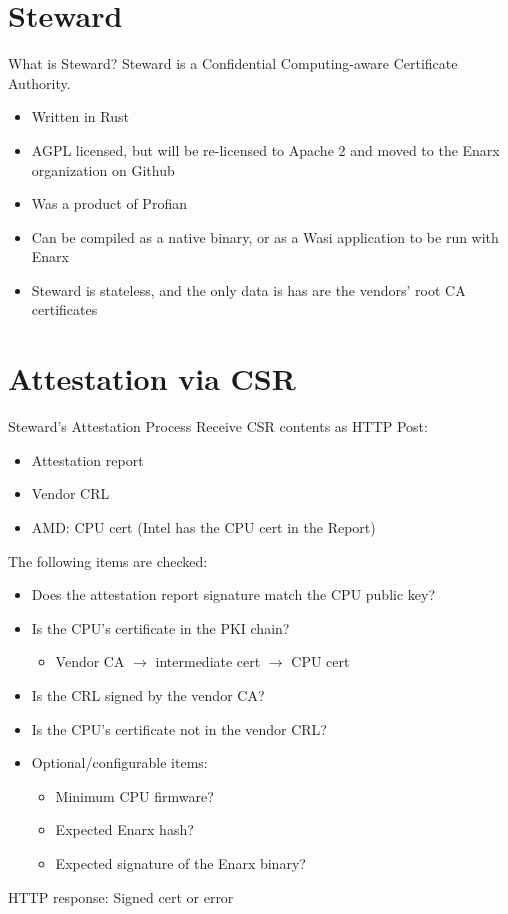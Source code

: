 \documentclass[graphics]{beamer}
\begin{document}
\section{Steward}
\begin{frame}{What is Steward?}
Steward is a Confidential Computing-aware Certificate Authority.
\begin{itemize}
\item Written in Rust
\item AGPL licensed, but will be re-licensed to Apache 2 and moved to the Enarx organization on Github
\item Was a product of Profian
\item Can be compiled as a native binary, or as a Wasi application to be run with Enarx
\item Steward is stateless, and the only data is has are the vendors' root CA certificates
\end{itemize}

\end{frame}

\section{Attestation via CSR}
\begin{frame}{Steward's Attestation Process}
Receive CSR contents as HTTP Post:
\begin{itemize}
    \item Attestation report
    \item Vendor CRL
    \item AMD: CPU cert (Intel has the CPU cert in the Report)
\end{itemize}

The following items are checked:
\begin{itemize}
    \item Does the attestation report signature match the CPU public key?
    \item Is the CPU's certificate in the PKI chain?
    \begin{itemize}
        \item Vendor CA $\rightarrow$ intermediate cert $\rightarrow$ CPU cert
    \end{itemize}
    \item Is the CRL signed by the vendor CA?
    \item Is the CPU's certificate not in the vendor CRL?
    \item Optional/configurable items:
    \begin{itemize}
        \item Minimum CPU firmware?
        \item Expected Enarx hash?
        \item Expected signature of the Enarx binary?
    \end{itemize}
\end{itemize}

HTTP response: Signed cert or error
\end{frame}
\end{document}
